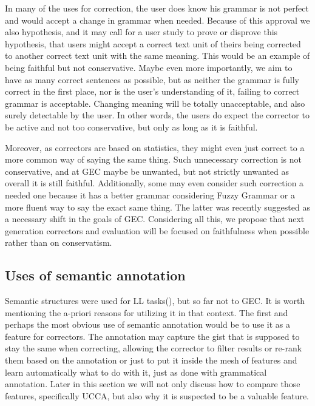 \documentclass[english]{article}
\begin{document}
In many of the uses for correction,
the user does know his grammar is not perfect and would accept
a change in grammar when needed. Because of this approval we also
hypothesis, and it may call for a user study to prove or disprove
this hypothesis, that users might accept a correct text unit of theirs
being corrected to another correct text unit with the same meaning.
This would be an example of being faithful but not conservative.
Maybe even more importantly, we aim to have as many correct sentences
as possible, but as neither the grammar is fully correct in the first place,
nor is the user's understanding of it, failing to correct grammar
is acceptable. Changing meaning will be totally unacceptable, and
also surely detectable by the user. In other words, the users do expect
the corrector to be active and not too conservative, but
only as long as it is faithful. 

Moreover, as correctors are based on statistics, they might even
just correct to a more common way of saying the same thing. Such unnecessary
correction is not conservative, and at GEC maybe be unwanted, but not strictly unwanted as overall
it is still faithful. Additionally, some may even
consider such correction a needed one because it has a better grammar considering
Fuzzy Grammar\cite{lakoff1973fuzzy,madnani2011they} or a more fluent
way to say the exact same thing. The latter was recently suggested as a necessary
shift in the goals of GEC\cite{sakaguchi2016reassessing}.
Considering all this, we propose that next generation correctors and evaluation will be focused on faithfulness
when possible rather than on conservatism.

\subsection{Uses of semantic annotation}

Semantic structures were used for LL tasks(\cite{king2013shallow}), but so far not to GEC. It is worth mentioning the a-priori reasons for utilizing
it in that context. The first and perhaps the most obvious use of semantic annotation
would be to use it as a feature for correctors. The annotation may
capture the gist that is supposed to stay the same when correcting,
allowing the corrector to filter results or re-rank them based on
the annotation or just to put it inside the mesh of features and learn
automatically what to do with it, just as done with grammatical annotation.
Later in this section we will not only discuss how to compare those
features, specifically UCCA, but also why it is suspected to be a
valuable feature.
\end{document}

